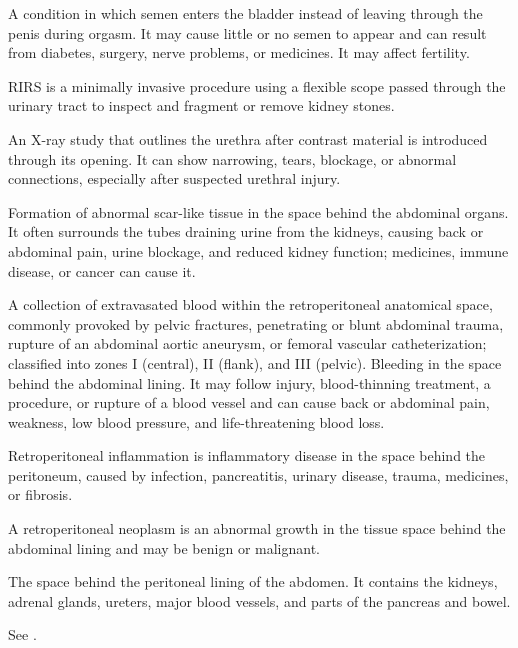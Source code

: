  A condition in which semen enters the bladder instead of leaving through the penis during orgasm. It may cause little or no semen to appear and can result from diabetes, surgery, nerve problems, or medicines. It may affect fertility.

 RIRS is a minimally invasive procedure using a flexible scope passed through the urinary tract to inspect and fragment or remove kidney stones.

 An X-ray study that outlines the urethra after contrast material is introduced through its opening. It can show narrowing, tears, blockage, or abnormal connections, especially after suspected urethral injury.

 Formation of abnormal scar-like tissue in the space behind the abdominal organs. It often surrounds the tubes draining urine from the kidneys, causing back or abdominal pain, urine blockage, and reduced kidney function; medicines, immune disease, or cancer can cause it.

 A collection of extravasated blood within the retroperitoneal anatomical space, commonly provoked by pelvic fractures, penetrating or blunt abdominal trauma, rupture of an abdominal aortic aneurysm, or femoral vascular catheterization; classified into zones I (central), II (flank), and III (pelvic).
 Bleeding in the space behind the abdominal lining. It may follow injury, blood-thinning treatment, a procedure, or rupture of a blood vessel and can cause back or abdominal pain, weakness, low blood pressure, and life-threatening blood loss.

 Retroperitoneal inflammation is inflammatory disease in the space behind the peritoneum, caused by infection, pancreatitis, urinary disease, trauma, medicines, or fibrosis.

 A retroperitoneal neoplasm is an abnormal growth in the tissue space behind the abdominal lining and may be benign or malignant.

 The space behind the peritoneal lining of the abdomen. It contains the kidneys, adrenal glands, ureters, major blood vessels, and parts of the pancreas and bowel.

 See .

